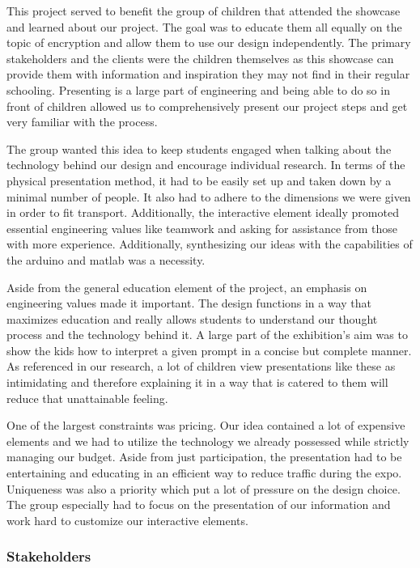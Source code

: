 \documentclass[conference]{IEEEtran}
\begin{document}
\par This project served to benefit the group of children that attended the showcase and learned about our project. The goal was to educate them all equally on the topic of encryption and allow them to use our design independently. The primary stakeholders and the clients were the children themselves as this showcase can provide them with information and inspiration they may not find in their regular schooling. Presenting is a large part of engineering and being able to do so in front of children allowed us to comprehensively present our project steps and get very familiar with the process.	
\par The group wanted this idea to keep students engaged when talking about the technology behind our design and encourage individual research. In terms of the physical presentation method, it had to be easily set up and taken down by a minimal number of people. It also had to adhere to the dimensions we were given in order to fit transport. Additionally, the interactive element ideally promoted essential engineering values like teamwork and asking for assistance from those with more experience. Additionally, synthesizing our ideas with the capabilities of the arduino and matlab was a necessity.
\par Aside from the general education element of the project, an emphasis on engineering values made it important. The design functions in a way that maximizes education and really allows students to understand our thought process and the technology behind it. A large part of the exhibition's aim was to show the kids how to interpret a given prompt in a concise but complete manner. As referenced in our research, a lot of children view presentations like these as intimidating \cite{b16} and therefore explaining it in a way that is catered to them will reduce that unattainable feeling.
\par One of the largest constraints was pricing. Our idea contained a lot of expensive elements and we had to utilize the technology we already possessed while strictly managing our budget. Aside from just participation, the presentation had to be entertaining and educating in an efficient way to reduce traffic during the expo. Uniqueness was also a priority which put a lot of pressure on the design choice. The group especially had to focus on the presentation of our information and work hard to customize our interactive elements.

\subsubsection{Stakeholders}
\end{document}
